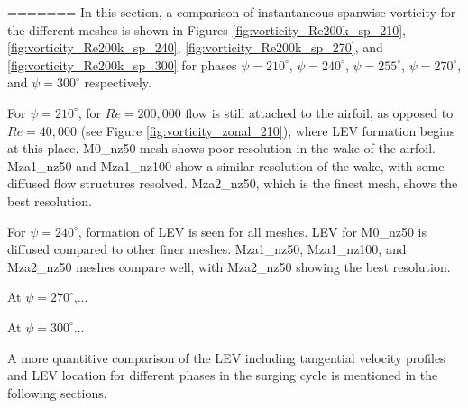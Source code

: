 =======
In this section, a comparison of instantaneous spanwise vorticity for the different meshes is shown in Figures \ref{fig:vorticity_Re200k_sp_210}, \ref{fig:vorticity_Re200k_sp_240},  \ref{fig:vorticity_Re200k_sp_270}, and \ref{fig:vorticity_Re200k_sp_300} for phases $\psi=210^\circ$, $\psi=240^\circ$, $\psi=255^\circ$, $\psi=270^\circ$, and $\psi=300^\circ$ respectively. 

For $\psi=210^\circ$, for $Re=200,000$ flow is still attached to the airfoil, as opposed to $Re=40,000$ (see Figure \ref{fig:vorticity_zonal_210}), where LEV formation begins at this place.
M0\_nz50 mesh shows poor resolution in the wake of the airfoil.
Mza1\_nz50 and Mza1\_nz100 show a similar resolution of the wake, with some diffused flow structures resolved.
Mza2\_nz50, which is the finest mesh, shows the best resolution. 

For $\psi=240^\circ$, formation of LEV is seen for all meshes.
LEV for M0\_nz50 is diffused compared to other finer meshes.
Mza1\_nz50, Mza1\_nz100, and Mza2\_nz50 meshes compare well, with Mza2\_nz50 showing the best resolution.


At $\psi=270^\circ$,...


At $\psi=300^\circ$...

A more quantitive comparison of the LEV including tangential velocity profiles and LEV location for different phases in the surging cycle is mentioned in the following sections.



